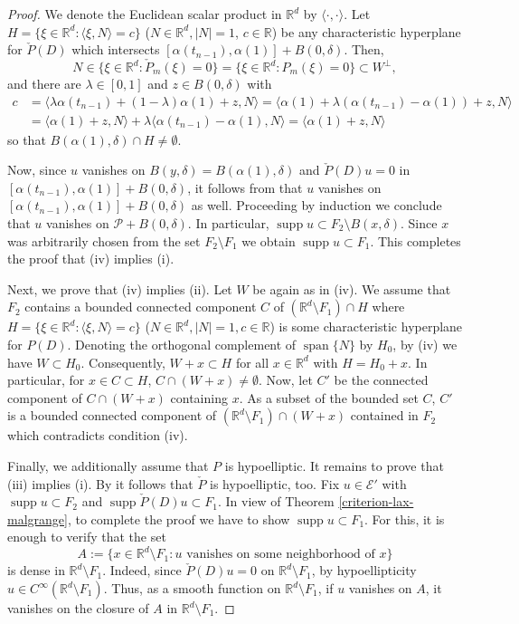 \documentclass[10pt,leqno]{amsart}
\theoremstyle{definition}
\newcommand{\R}{\mathbb R}
\newcommand{\supp}{\operatorname{supp}}
\begin{document}
\begin{proof}
	We denote the Euclidean scalar product in $\R^d$ by $\langle\cdot,\cdot\rangle$. Let $H=\{\xi\in\R^d\colon\langle\xi,N\rangle=c\}$ ($N\in\R^d, |N|=1$, $c\in\R$) be any characteristic hyperplane for $\check P(D)$ which intersects $[\alpha(t_{n-1}),\alpha(1)]+B(0,\delta)$. Then,
	$$N\in\{\xi\in\R^d\colon\check P_m(\xi)=0\}=\{\xi\in\R^d\colon P_m(\xi)=0\}\subset W^\perp,$$
	and there are $\lambda\in[0,1]$ and $z\in B(0,\delta)$ with
	\begin{align*}
		c&=\langle\lambda\alpha(t_{n-1})+(1-\lambda)\alpha(1)+z,N\rangle=\langle\alpha(1)+\lambda(\alpha(t_{n-1})-\alpha(1))+z,N\rangle\\
		&=\langle\alpha(1)+z,N\rangle+\lambda\langle\alpha(t_{n-1})-\alpha(1),N\rangle
		=\langle\alpha(1)+z,N\rangle
	\end{align*}
	so that $B(\alpha(1),\delta)\cap H\neq\emptyset$.
	
	Now, since $u$ vanishes on $B(y,\delta)=B(\alpha(1),\delta)$ and $\check P(D)u=0$ in $[\alpha(t_{n-1}),\alpha(1)]+B(0,\delta)$, it follows from \cite[Theorem 8.6.8]{Hor1} that $u$ vanishes on $[\alpha(t_{n-1}),\alpha(1)]+B(0,\delta)$ as well. Proceeding by induction we conclude that $u$ vanishes on $\mathcal{P}+B(0,\delta)$. In particular, $\supp u\subset F_2\setminus B(x,\delta)$. Since $x$ was arbitrarily chosen from the set $F_2\setminus F_1$ we obtain $\supp u\subset F_1$. This completes the proof that (iv) implies (i).
	
	Next, we prove that (iv) implies (ii). Let $W$ be again as in (iv). We assume that $F_2$ contains a bounded connected component $C$ of $(\R^d\setminus F_1)\cap H$ where $H=\{\xi\in\R^d\colon\langle\xi,N\rangle=c\}$ ($N\in\R^d, |N|=1, c\in \R$) is some characteristic hyperplane for $P(D)$. Denoting the orthogonal complement of $\operatorname{span}\{N\}$ by $H_0$, by (iv) we have $W\subset H_0$. Consequently, $W+x\subset H$ for all $x\in\R^d$ with $H=H_0+x$. In particular, for $x\in C\subset H$, $C\cap(W+x)\neq\emptyset$. Now, let $C'$ be the connected component of $C\cap(W+x)$ containing $x$. As a subset of the bounded set $C$, $C'$ is a bounded connected component of $(\R^d\setminus F_1)\cap(W+x)$ contained in $F_2$ which contradicts condition (iv).
	
	Finally, we additionally assume that $P$ is hypoelliptic. It remains to prove that (iii) implies (i). By \cite[Theorem 11.1.3]{Hor2} it follows that $\check{P}$ is hypoelliptic, too. Fix $u\in\mathscr{E}'$ with $\supp u\subset F_2$ and $\supp \check P(D)u\subset F_1$. In view of Theorem \ref{criterion-lax-malgrange}, to complete the proof we have to show $\supp u\subset F_1$.
	For this, it is enough to verify that the set 
	$$A:=\{x\in\R^d\setminus F_1\colon u \text{ vanishes on some neighborhood of } x\}$$
	is dense in $\R^d\setminus F_1$. Indeed, since $\check P(D)u=0$ on $\R^d\setminus F_1$, by hypoellipticity $u\in C^\infty(\R^d\setminus F_1)$. Thus, as a smooth function on $\R^d\setminus F_1$, if $u$ vanishes on $A$, it vanishes on the closure of $A$ in $\R^d\setminus F_1$.
	

\end{proof}
\end{document}
